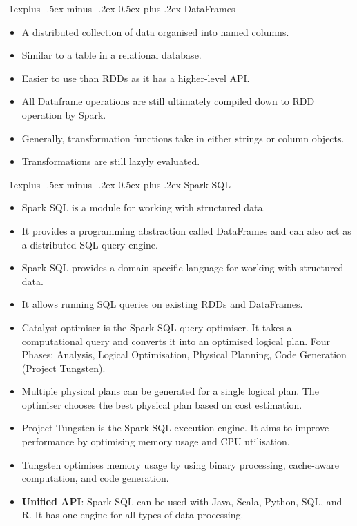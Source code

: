 \documentclass[10pt, landscape]{article}
\makeatletter
\renewcommand{\subsection}{\@startsection{subsection}{2}{0mm}%
  {-1explus -.5ex minus -.2ex}%
  {0.5ex plus .2ex}%
{\normalfont\normalsize\bfseries}}
\makeatother
\begin{document}
\begin{multicols*}{4}
  \subsection{DataFrames}
  \begin{itemize}
    \item A distributed collection of data organised into named columns.
    \item Similar to a table in a relational database.
    \item Easier to use than RDDs as it has a higher-level API.
    \item All Dataframe operations are still ultimately compiled down to RDD operation by Spark.
    \item Generally, transformation functions take in either strings or column objects.
    \item Transformations are still lazyly evaluated.
  \end{itemize}

  \subsection{Spark SQL}

  \begin{itemize}
    \item Spark SQL is a module for working with structured data.
    \item It provides a programming abstraction called DataFrames and can also act as a distributed SQL query engine.
    \item Spark SQL provides a domain-specific language for working with structured data.
    \item It allows running SQL queries on existing RDDs and DataFrames.
    \item Catalyst optimiser is the Spark SQL query optimiser. It takes a computational query and converts it into an optimised logical plan. Four Phases: Analysis, Logical Optimisation, Physical Planning, Code Generation (Project Tungsten).
    \item Multiple physical plans can be generated for a single logical plan. The optimiser chooses the best physical plan based on cost estimation.
    \item Project Tungsten is the Spark SQL execution engine. It aims to improve performance by optimising memory usage and CPU utilisation.
    \item Tungsten optimises memory usage by using binary processing, cache-aware computation, and code generation.
    \item \textbf{Unified API}: Spark SQL can be used with Java, Scala, Python, SQL, and R. It has one engine for all types of data processing.
  \end{itemize}


\end{multicols*}
\end{document}

